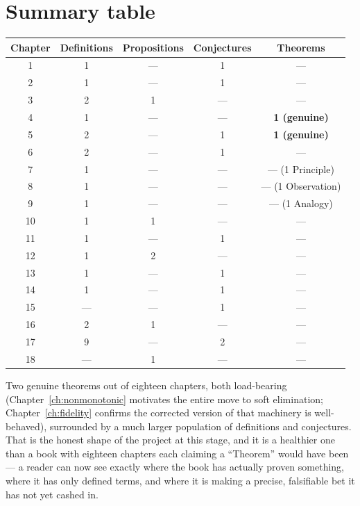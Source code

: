 \section*{Summary table}

\begin{center}
\begin{tabular}{c c c c c}
\hline
\textbf{Chapter} & \textbf{Definitions} & \textbf{Propositions} & \textbf{Conjectures} & \textbf{Theorems} \\
\hline
1  & 1 & --- & 1 & --- \\
2  & 1 & --- & 1 & --- \\
3  & 2 & 1 & --- & --- \\
4  & 1 & --- & --- & \textbf{1 (genuine)} \\
5  & 2 & --- & 1 & \textbf{1 (genuine)} \\
6  & 2 & --- & 1 & --- \\
7  & 1 & --- & --- & --- (1 Principle) \\
8  & 1 & --- & --- & --- (1 Observation) \\
9  & 1 & --- & --- & --- (1 Analogy) \\
10 & 1 & 1 & --- & --- \\
11 & 1 & --- & 1 & --- \\
12 & 1 & 2 & --- & --- \\
13 & 1 & --- & 1 & --- \\
14 & 1 & --- & 1 & --- \\
15 & --- & --- & 1 & --- \\
16 & 2 & 1 & --- & --- \\
17 & 9 & --- & 2 & --- \\
18 & --- & 1 & --- & --- \\
\hline
\end{tabular}
\end{center}

Two genuine theorems out of eighteen chapters, both load-bearing (Chapter~\ref{ch:nonmonotonic} motivates the entire move to soft elimination; Chapter~\ref{ch:fidelity} confirms the corrected version of that machinery is well-behaved), surrounded by a much larger population of definitions and conjectures. That is the honest shape of the project at this stage, and it is a healthier one than a book with eighteen chapters each claiming a ``Theorem'' would have been --- a reader can now see exactly where the book has actually proven something, where it has only defined terms, and where it is making a precise, falsifiable bet it has not yet cashed in.
